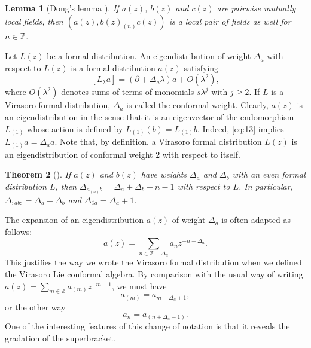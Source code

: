 \documentclass[a4paper, 12pt, reqno]{amsart}
\newtheorem{theorem}{Theorem}[subsection]
\newtheorem{lemma}[theorem]{Lemma}
\theoremstyle{remark}
\numberwithin{equation}{subsection}
\begin{document}
\begin{lemma}[Dong's lemma {\cite[LEMMA 3.2]{kac_vertex_1998}}]
  \label{lmm:2}
  If $a(z)$, $b(z)$ and $c(z)$ are pairwise mutually local fields, then $(a(z),b(z)_{(n)}c(z))$ is a local pair of fields as well for $n\in \mathbb{Z}$.
\end{lemma}

Let $L(z)$ be a formal distribution.
An eigendistribution of weight $\Delta_a$ with respect to $L(z)$ is a formal distribution $a(z)$ satisfying
\begin{equation}
  \label{eq:13}
  [L_{\lambda}a] = (\partial + \Delta_a\lambda)a + O(\lambda^2),
\end{equation}
where $O(\lambda^2)$ denotes sums of terms of monomials $s\lambda^j$ with $j \ge 2$.
If $L$ is a Virasoro formal distribution, $\Delta_a$ is called the conformal weight.
Clearly, $a(z)$ is an eigendistribution in the sense that it is an eigenvector of the endomorphism $L_{(1)}$ whose action is defined by $L_{(1)}(b) = L_{(1)}b$.
Indeed, \eqref{eq:13} implies $L_{(1)}a = \Delta_aa$.
Note that, by definition, a Virasoro formal distribution $L(z)$ is an eigendistribution of conformal weight $2$ with respect to itself.

\begin{theorem}[{\cite[Proposition 3.7.4]{nozaradan_introduction_2008}}]
  \label{thr:8}
  If $a(z)$ and $b(z)$ have weights $\Delta_a$ and $\Delta_b$ with an even formal distribution $L$, then $\Delta_{a_{(n)}b} = \Delta_a + \Delta_b - n - 1$ with respect to $L$.
  In particular, $\Delta_{:ab:} = \Delta_a + \Delta_b$ and $\Delta_{\partial a} = \Delta_a + 1$.
\end{theorem}

The expansion of an eigendistribution $a(z)$ of weight $\Delta_a$ is often adapted as follows:
\begin{equation*}
  a(z) = \sum_{n \in \mathbb{Z} - \Delta_a}a_nz^{-n - \Delta_a}.
\end{equation*}
This justifies the way we wrote the Virasoro formal distribution when we defined the Virasoro Lie conformal algebra.
By comparison with the usual way of writing $a(z) = \sum_{m \in \mathbb{Z}}a_{(m)}z^{-m - 1}$, we must have
\begin{equation*}
  a_{(m)} = a_{m - \Delta_a + 1},
\end{equation*}
or the other way
\begin{equation*}
  a_n = a_{(n + \Delta_a - 1)}.
\end{equation*}
One of the interesting features of this change of notation is that it reveals the gradation of the superbracket.
\end{document}
